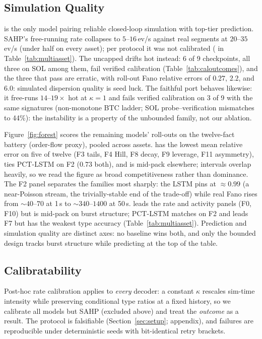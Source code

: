 \subsection{Simulation Quality}
\label{sec:simulation}
\ssppp{} is the only model pairing reliable closed-loop simulation with
top-tier prediction. SAHP's free-running rate collapses to
$5$--$16$\,ev/s against real segments at $20$--$35$\,ev/s (under half on
every asset); per protocol it was not calibrated (\dag{} in
Table~\ref{tab:multiasset}). The uncapped \spppu{} drifts hot
instead: 6 of 9 checkpoints, all three on SOL among them, fail verified
calibration (Table~\ref{tab:caloutcomes}), and the three that pass are
erratic, with roll-out Fano relative errors of $0.27$, $2.2$, and $6.0$:
simulated dispersion quality is seed luck. The faithful \spppub{} port
behaves likewise: it free-runs $14$--$19\times$ hot at $\kappa=1$ and
fails verified calibration on 3 of 9 with the same signatures
(non-monotone BTC ladder; SOL probe--verification mismatches to 44\%):
the instability is a property of the unbounded family, not our ablation.

Figure~\ref{fig:forest} scores the remaining models' roll-outs on the
twelve-fact battery (order-flow proxy), pooled across assets. \ssppp{} has
the lowest mean relative error on five of twelve (F3 tails, F4 Hill, F8
decay, F9 leverage, F11 asymmetry), ties PCT-LSTM on F2 ($0.73$ both), and
is mid-pack elsewhere; intervals overlap heavily, so we read the figure as
broad competitiveness rather than dominance. The F2 panel separates the
families most sharply: the LSTM pins at ${\approx}0.99$ (a near-Poisson
stream, the trivially-stable end of the trade-off) while real Fano rises
from ${\sim}40$--$70$ at 1\,s to ${\sim}340$--$1400$ at 50\,s. \nhp{}
leads the rate and activity panels (F0, F10) but is mid-pack on burst
structure; PCT-LSTM matches \ssppp{} on F2 and leads F7 but has the
weakest type accuracy (Table~\ref{tab:multiasset}). Prediction and simulation quality are distinct
axes: no baseline wins both, and only the bounded design tracks burst
structure while predicting at the top of the table.

\subsection{Calibratability}
\label{sec:calibratability}
Post-hoc rate calibration applies to \emph{every} decoder: a constant
$\kappa$ rescales sim-time intensity while preserving conditional type
ratios at a fixed history, so we calibrate all models but SAHP (excluded
above) and treat the \emph{outcome} as a result. The protocol is
falsifiable (Section~\ref{sec:setup}; appendix), and failures are
reproducible under deterministic seeds with bit-identical retry brackets.

